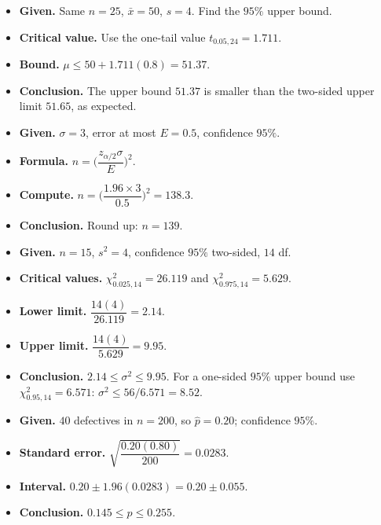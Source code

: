 \begin{example}
\begin{itemize}
  \item \textbf{Given.} Same $n=25$, $\bar{x}=50$, $s=4$. Find the $95\%$ upper bound.
  \item \textbf{Critical value.} Use the one-tail value $t_{0.05,24}=1.711$.
  \item \textbf{Bound.} $\mu\le50+1.711(0.8)=51.37$.
  \item \textbf{Conclusion.} The upper bound $51.37$ is smaller than the two-sided upper limit $51.65$, as expected.
\end{itemize}
\end{example}

\begin{example}
\begin{itemize}
  \item \textbf{Given.} $\sigma=3$, error at most $E=0.5$, confidence $95\%$.
  \item \textbf{Formula.} $n=\Big(\dfrac{z_{\alpha/2}\sigma}{E}\Big)^2$.
  \item \textbf{Compute.} $n=\Big(\dfrac{1.96\times3}{0.5}\Big)^2=138.3$.
  \item \textbf{Conclusion.} Round up: $n=139$.
\end{itemize}
\end{example}

\begin{example}
\begin{itemize}
  \item \textbf{Given.} $n=15$, $s^2=4$, confidence $95\%$ two-sided, $14$ df.
  \item \textbf{Critical values.} $\chi^2_{0.025,14}=26.119$ and $\chi^2_{0.975,14}=5.629$.
  \item \textbf{Lower limit.} $\dfrac{14(4)}{26.119}=2.14$.
  \item \textbf{Upper limit.} $\dfrac{14(4)}{5.629}=9.95$.
  \item \textbf{Conclusion.} $2.14\le\sigma^2\le9.95$. For a one-sided $95\%$ upper bound use $\chi^2_{0.95,14}=6.571$: $\sigma^2\le56/6.571=8.52$.
\end{itemize}
\end{example}

\begin{example}
\begin{itemize}
  \item \textbf{Given.} $40$ defectives in $n=200$, so $\hat{p}=0.20$; confidence $95\%$.
  \item \textbf{Standard error.} $\sqrt{\dfrac{0.20(0.80)}{200}}=0.0283$.
  \item \textbf{Interval.} $0.20\pm1.96(0.0283)=0.20\pm0.055$.
  \item \textbf{Conclusion.} $0.145\le p\le0.255$.
\end{itemize}
\end{example}

